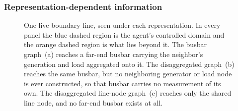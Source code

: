 
\subsubsection{Representation-dependent information}

 

\begin{figure}[H]
  \centering
  \resizebox{\linewidth}{!}{%
  }
  \caption{One live boundary line, seen under each representation. In every
  panel the blue dashed region is the agent's controlled domain and the orange
  dashed region is what lies beyond it. The busbar graph~(a) reaches a far-end
  busbar carrying the neighbor's generation and load aggregated onto it. The
  disaggregated graph~(b) reaches the same busbar, but no neighboring generator
  or load node is ever constructed, so that busbar carries no measurement of
  its own. The disaggregated line-node graph~(c) reaches only the shared line
  node, and no far-end busbar exists at all.}
  \label{fig:representation-dependent-neighbors}
\end{figure}

